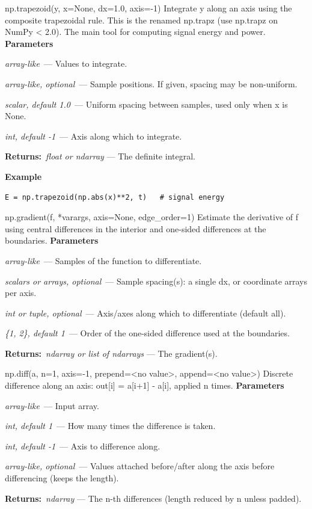 \documentclass[10pt]{article}
\newenvironment{params}
  {\smallskip\textbf{\small\color{accent}Parameters}\par\nopagebreak
   \begin{description}[leftmargin=1.3em,itemsep=1.5pt,parsep=0pt,topsep=1pt,
      labelindent=0pt,style=sameline,font=\normalfont]}
  {\end{description}}
\newcommand{\pitem}[3]{\item[{\ttfamily\color{accent}#1}]{\itshape #2}\ --- #3}
\newcommand{\preturn}[2]{\smallskip\textbf{\small\color{accent}Returns:}\ {\itshape #1} --- #2\par}
\begin{document}
\begin{func}{np.trapezoid(y, x=None, dx=1.0, axis=-1)}
Integrate y along an axis using the composite trapezoidal rule. This is the renamed np.trapz (use np.trapz on NumPy < 2.0). The main tool for computing signal energy and power.
\begin{params}
\pitem{y}{array-like}{Values to integrate.}
\pitem{x}{array-like, optional}{Sample positions. If given, spacing may be non-uniform.}
\pitem{dx}{scalar, default 1.0}{Uniform spacing between samples, used only when x is None.}
\pitem{axis}{int, default -1}{Axis along which to integrate.}
\end{params}
\preturn{float or ndarray}{The definite integral.}
\smallskip\textbf{\small\color{accent}Example}
\begin{lstlisting}[style=py]
E = np.trapezoid(np.abs(x)**2, t)   # signal energy
\end{lstlisting}
\end{func}
\medskip

\begin{func}{np.gradient(f, *varargs, axis=None, edge\_order=1)}
Estimate the derivative of f using central differences in the interior and one-sided differences at the boundaries.
\begin{params}
\pitem{f}{array-like}{Samples of the function to differentiate.}
\pitem{varargs}{scalars or arrays, optional}{Sample spacing(s): a single dx, or coordinate arrays per axis.}
\pitem{axis}{int or tuple, optional}{Axis/axes along which to differentiate (default all).}
\pitem{edge\_order}{\{1, 2\}, default 1}{Order of the one-sided difference used at the boundaries.}
\end{params}
\preturn{ndarray or list of ndarrays}{The gradient(s).}
\end{func}
\medskip

\begin{func}{np.diff(a, n=1, axis=-1, prepend=<no value>, append=<no value>)}
Discrete difference along an axis: out[i] = a[i+1] - a[i], applied n times.
\begin{params}
\pitem{a}{array-like}{Input array.}
\pitem{n}{int, default 1}{How many times the difference is taken.}
\pitem{axis}{int, default -1}{Axis to difference along.}
\pitem{prepend / append}{array-like, optional}{Values attached before/after along the axis before differencing (keeps the length).}
\end{params}
\preturn{ndarray}{The n-th differences (length reduced by n unless padded).}
\end{func}
\medskip
\end{document}
